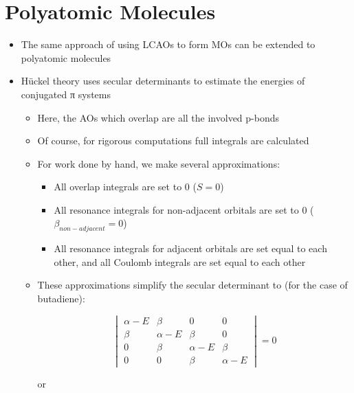 \documentclass[12pt, openany, letterpaper]{memoir}
\begin{document}
\section{Polyatomic Molecules}
\begin{itemize}
	\item The same approach of using LCAOs to form MOs can be extended to polyatomic molecules
	\item H\"uckel theory uses secular determinants to estimate the energies of conjugated π systems
	\begin{itemize}
		\item Here, the AOs which overlap are all the involved p-bonds
		\item Of course, for rigorous computations full integrals are calculated
		\item For work done by hand, we make several approximations: 
		\begin{itemize}
			\item All overlap integrals are set to 0 ($S=0$)
			\item All resonance integrals for non-adjacent orbitals are set to 0 ($\beta_{non-adjacent}=0$)
			\item All resonance integrals for adjacent orbitals are set equal to each other, and all Coulomb integrals are set equal to each other
		\end{itemize}
		\item These approximations simplify the secular determinant to (for the case of butadiene):
		
		\[\begin{vmatrix} 
		\alpha -E & \beta & 0 & 0 \\
		\beta & \alpha - E & \beta & 0 \\
		0 & \beta & \alpha - E & \beta \\
		0 & 0 & \beta & \alpha -E
		\end{vmatrix} =0\]
		
		or
		

\end{itemize}
\end{itemize}
\end{document}
